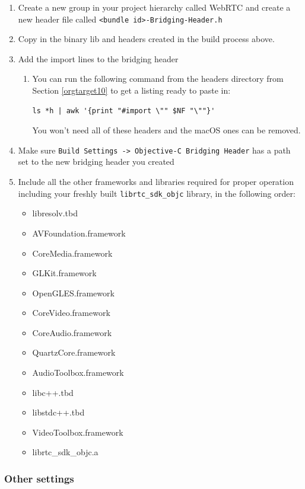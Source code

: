 \documentclass[a4paper,11pt]{article}
\begin{document}
\begin{enumerate}
\begin{enumerate}
\begin{enumerate}
\item Create a new group in your project hierarchy called WebRTC and
create a new header file called \texttt{<bundle id>-Bridging-Header.h}
\item Copy in the binary lib and headers created in the build process above.
\item Add the import lines to the bridging header
\begin{enumerate}
\item You can run the following command from the headers directory from Section \ref{orgtarget10} to
get a listing ready to paste in:
\begin{verbatim}
ls *h | awk '{print "#import \"" $NF "\""}'
\end{verbatim}
You won't need all of these headers and the macOS ones can be
removed.
\end{enumerate}
\item Make sure \texttt{Build Settings -> Objective-C Bridging Header} has a
path set to the new bridging header you created
\item Include all the other frameworks and libraries required for proper
operation including your freshly built \texttt{librtc\_sdk\_objc} library,
in the following order:
\begin{itemize}
\item libresolv.tbd
\item AVFoundation.framework
\item CoreMedia.framework
\item GLKit.framework
\item OpenGLES.framework
\item CoreVideo.framework
\item CoreAudio.framework
\item QuartzCore.framework
\item AudioToolbox.framework
\item libc++.tbd
\item libstdc++.tbd
\item VideoToolbox.framework
\item librtc\_sdk\_objc.a
\end{itemize}
\end{enumerate}
\end{enumerate}
\end{enumerate}
\subsubsection{Other settings}
\label{sec:orgheadline48}
\end{document}
